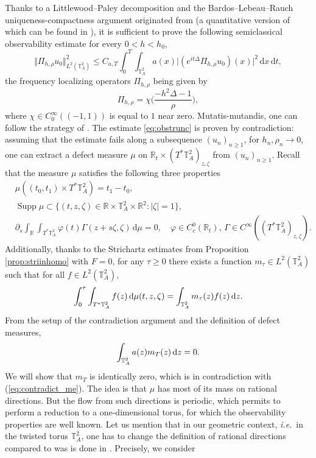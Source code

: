 \documentclass[a4paper,11pt]{amsart}
\numberwithin{equation}{section}
\theoremstyle{definition}
\DeclareMathOperator{\Supp}{Supp}
\newcommand{\twotorus}{\mathbb T^2_A}
\begin{document}
Thanks to a Littlewood--Paley decomposition and the Bardos--Lebeau--Rauch uniqueness-compactness argument originated from \cite{BLR} (a quantitative version of which can be found in \cite[Theorem 4]{BBZ}), it is sufficient to prove the following semiclassical observability estimate for every $0<h<h_0$,
\begin{equation}\label{eq:obstrunc}
    \Vert \Pi_{h,\rho}u_0\Vert^2_{L^2(\twotorus)}\le C_{a,T}\int_0^T\int_{\twotorus}
    a(x)\big\vert(e^{it\Delta}\Pi_{h,\rho}u_0)(x)\big\vert^2\,\mathrm dx\,\mathrm dt,
\end{equation}
the frequency localizing operators $\Pi_{h,\rho}$ being given by
\[
    \Pi_{h,\rho} = \chi\bigg(\frac{-h^2\Delta-1}{\rho}\bigg),
\]
where $\chi\in C^{\infty}_0((-1,1))$ is equal to $1$ near zero. Mutatis-mutandis, one can follow the strategy of \cite{BZ}. The estimate \eqref{eq:obstrunc} is proven by contradiction: assuming that the estimate fails along a subsequence $(u_n)_{n\geq 1}$, for $h_n, \rho_n \to 0$, one can extract a defect measure $\mu$ on $\mathbb R_t\times(T^*\twotorus)_{z, \zeta}$ from $(u_n)_{n\geq 1}$. Recall that the measure $\mu$ satisfies the following three properties
\begin{align} 
    & \mu((t_0,t_1)\times T^*\twotorus) = t_1-t_0, \label{eq:contradict_me} \\[5pt]
    & \Supp\mu\subset\big\{(t,z,\zeta)\in\mathbb R\times\twotorus\times\mathbb R^2 : \vert\zeta\vert = 1\big\}, \\
    & \partial_s\int_{\mathbb R}\int_{T^*\twotorus}\varphi(t)\Gamma(z+s\zeta,\zeta)\,\mathrm d\mu = 0,\quad \varphi\in C^0_c(\mathbb R_t),\, \Gamma\in C^{\infty}((T^*\twotorus)_{z, \zeta}) \label{eq:invflowgeo}.
\end{align}
Additionally, thanks to the Strichartz estimates from Proposition \ref{prop:striinhomo} with $F=0$, for any $\tau \geq 0$ there exists a function $m_\tau \in L^2(\twotorus)$ such that for all $f\in L^2(\twotorus)$,
\[
    \int_0^\tau \int_{T^* \twotorus} f(z)\,\mathrm d\mu(t, z, \zeta) = \int_{\twotorus} m_\tau(z) f(z)\,{\rm d}z.
\]
From the setup of the contradiction argument and the definition of defect measures,
$$
\int_{\twotorus} a(z) m_T(z) \, {\rm d}z = 0.
$$
We will show that $m_T$ is identically zero, which is in contradiction with (\ref{eq:contradict_me}). The idea is that $\mu$ has most of its mass on rational directions. But the flow from such directions is periodic, which permits to perform a reduction to a one-dimensional torus, for which the observability properties are well known. Let us mention that in our geometric context, \textit{i.e.}~in the twisted torus $\twotorus$, one has to change the definition of rational directions compared to was is done in \cite{BZ}. Precisely, we consider
\end{document}
